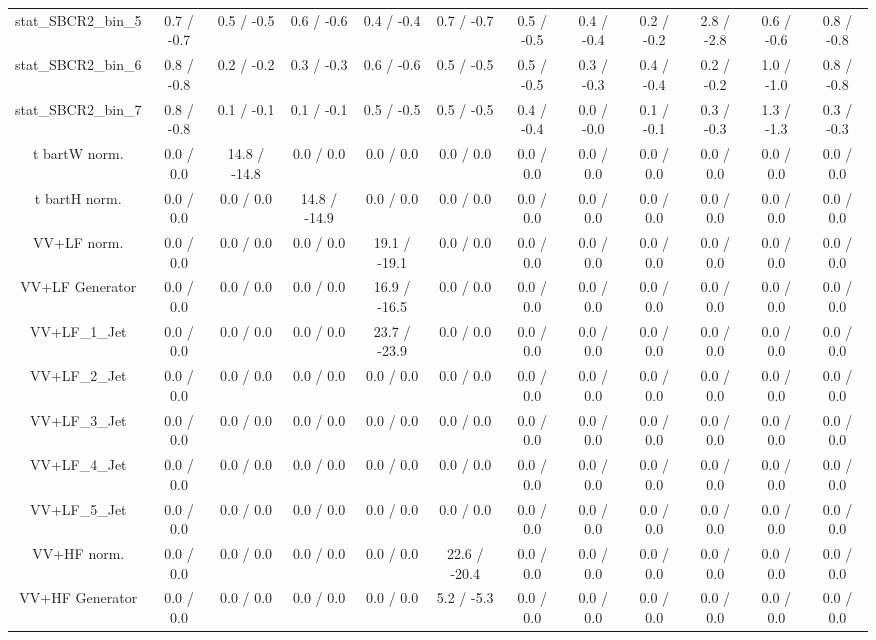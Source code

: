 \begin{table}[htbp]
\begin{center}
\begin{tabular}{|c|c|c|c|c|c|c|c|c|c|c|c|}
 stat_SBCR2_bin_5 & 0.7 / -0.7 & 0.5 / -0.5 & 0.6 / -0.6 & 0.4 / -0.4 & 0.7 / -0.7 & 0.5 / -0.5 & 0.4 / -0.4 & 0.2 / -0.2 & 2.8 / -2.8 & 0.6 / -0.6 & 0.8 / -0.8 \\ 
 stat_SBCR2_bin_6 & 0.8 / -0.8 & 0.2 / -0.2 & 0.3 / -0.3 & 0.6 / -0.6 & 0.5 / -0.5 & 0.5 / -0.5 & 0.3 / -0.3 & 0.4 / -0.4 & 0.2 / -0.2 & 1.0 / -1.0 & 0.8 / -0.8 \\ 
 stat_SBCR2_bin_7 & 0.8 / -0.8 & 0.1 / -0.1 & 0.1 / -0.1 & 0.5 / -0.5 & 0.5 / -0.5 & 0.4 / -0.4 & 0.0 / -0.0 & 0.1 / -0.1 & 0.3 / -0.3 & 1.3 / -1.3 & 0.3 / -0.3 \\ 
  t bar{t}W norm. & 0.0 / 0.0 & 14.8 / -14.8 & 0.0 / 0.0 & 0.0 / 0.0 & 0.0 / 0.0 & 0.0 / 0.0 & 0.0 / 0.0 & 0.0 / 0.0 & 0.0 / 0.0 & 0.0 / 0.0 & 0.0 / 0.0 \\ 
  t bar{t}H norm. & 0.0 / 0.0 & 0.0 / 0.0 & 14.8 / -14.9 & 0.0 / 0.0 & 0.0 / 0.0 & 0.0 / 0.0 & 0.0 / 0.0 & 0.0 / 0.0 & 0.0 / 0.0 & 0.0 / 0.0 & 0.0 / 0.0 \\ 
  VV+LF norm. & 0.0 / 0.0 & 0.0 / 0.0 & 0.0 / 0.0 & 19.1 / -19.1 & 0.0 / 0.0 & 0.0 / 0.0 & 0.0 / 0.0 & 0.0 / 0.0 & 0.0 / 0.0 & 0.0 / 0.0 & 0.0 / 0.0 \\ 
  VV+LF Generator & 0.0 / 0.0 & 0.0 / 0.0 & 0.0 / 0.0 & 16.9 / -16.5 & 0.0 / 0.0 & 0.0 / 0.0 & 0.0 / 0.0 & 0.0 / 0.0 & 0.0 / 0.0 & 0.0 / 0.0 & 0.0 / 0.0 \\ 
  VV+LF_1_Jet & 0.0 / 0.0 & 0.0 / 0.0 & 0.0 / 0.0 & 23.7 / -23.9 & 0.0 / 0.0 & 0.0 / 0.0 & 0.0 / 0.0 & 0.0 / 0.0 & 0.0 / 0.0 & 0.0 / 0.0 & 0.0 / 0.0 \\ 
  VV+LF_2_Jet & 0.0 / 0.0 & 0.0 / 0.0 & 0.0 / 0.0 & 0.0 / 0.0 & 0.0 / 0.0 & 0.0 / 0.0 & 0.0 / 0.0 & 0.0 / 0.0 & 0.0 / 0.0 & 0.0 / 0.0 & 0.0 / 0.0 \\ 
  VV+LF_3_Jet & 0.0 / 0.0 & 0.0 / 0.0 & 0.0 / 0.0 & 0.0 / 0.0 & 0.0 / 0.0 & 0.0 / 0.0 & 0.0 / 0.0 & 0.0 / 0.0 & 0.0 / 0.0 & 0.0 / 0.0 & 0.0 / 0.0 \\ 
  VV+LF_4_Jet & 0.0 / 0.0 & 0.0 / 0.0 & 0.0 / 0.0 & 0.0 / 0.0 & 0.0 / 0.0 & 0.0 / 0.0 & 0.0 / 0.0 & 0.0 / 0.0 & 0.0 / 0.0 & 0.0 / 0.0 & 0.0 / 0.0 \\ 
  VV+LF_5_Jet & 0.0 / 0.0 & 0.0 / 0.0 & 0.0 / 0.0 & 0.0 / 0.0 & 0.0 / 0.0 & 0.0 / 0.0 & 0.0 / 0.0 & 0.0 / 0.0 & 0.0 / 0.0 & 0.0 / 0.0 & 0.0 / 0.0 \\ 
  VV+HF norm. & 0.0 / 0.0 & 0.0 / 0.0 & 0.0 / 0.0 & 0.0 / 0.0 & 22.6 / -20.4 & 0.0 / 0.0 & 0.0 / 0.0 & 0.0 / 0.0 & 0.0 / 0.0 & 0.0 / 0.0 & 0.0 / 0.0 \\ 
  VV+HF Generator & 0.0 / 0.0 & 0.0 / 0.0 & 0.0 / 0.0 & 0.0 / 0.0 & 5.2 / -5.3 & 0.0 / 0.0 & 0.0 / 0.0 & 0.0 / 0.0 & 0.0 / 0.0 & 0.0 / 0.0 & 0.0 / 0.0 \\ 

\end{tabular}
\end{center}
\end{table}
